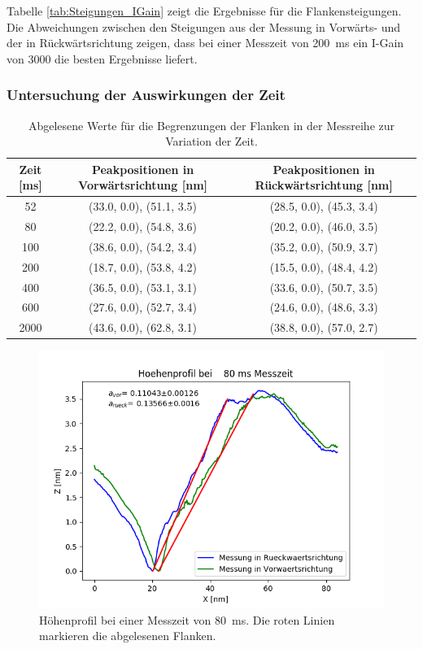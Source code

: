 \documentclass[12pt,a4paper]{article}
\begin{document}
Tabelle \ref{tab:Steigungen_IGain} zeigt die Ergebnisse für die Flankensteigungen. Die Abweichungen zwischen den Steigungen aus der Messung in Vorwärts- und der in Rückwärtsrichtung zeigen, dass bei einer Messzeit von \SI{200}{ms} ein I-Gain von 3000 die besten Ergebnisse liefert.

\subsubsection{Untersuchung der Auswirkungen der Zeit}

\begin{table}
\centering
\begin{tabular}{|c|c|c|}
\hline 
Zeit [ms] & Peakpositionen in Vorwärtsrichtung [nm] & Peakpositionen in Rückwärtsrichtung [nm] \\ 
\hline 
52 & (33.0, 0.0), (51.1, 3.5) & (28.5, 0.0), (45.3, 3.4) \\
\hline 
80 & (22.2, 0.0), (54.8, 3.6) & (20.2, 0.0), (46.0, 3.5) \\ 
\hline 
100 & (38.6, 0.0), (54.2, 3.4) & (35.2, 0.0), (50.9, 3.7) \\
\hline 
200 & (18.7, 0.0), (53.8, 4.2) & (15.5, 0.0), (48.4, 4.2) \\
\hline 
400 & (36.5, 0.0), (53.1, 3.1) & (33.6, 0.0), (50.7, 3.5) \\
\hline 
600 & (27.6, 0.0), (52.7, 3.4) & (24.6, 0.0), (48.6, 3.3) \\
\hline 
2000 & (43.6, 0.0), (62.8, 3.1) & (38.8, 0.0), (57.0, 2.7) \\
\hline 
\end{tabular} 
\caption{Abgelesene Werte für die Begrenzungen der Flanken in der Messreihe zur Variation der Zeit.}
\label{tab:Peaks_Zeit}
\end{table}

\begin{figure}
\centering
\includegraphics[scale=0.8]{Bilder/Profil_Zeit_80_Peakbestimmung.png}
\caption{Höhenprofil bei einer Messzeit von \SI{80}{ms}. Die roten Linien markieren die abgelesenen Flanken.}
\label{fig:Gold_Zeit_Flankensteigung}
\end{figure}
\end{document}
